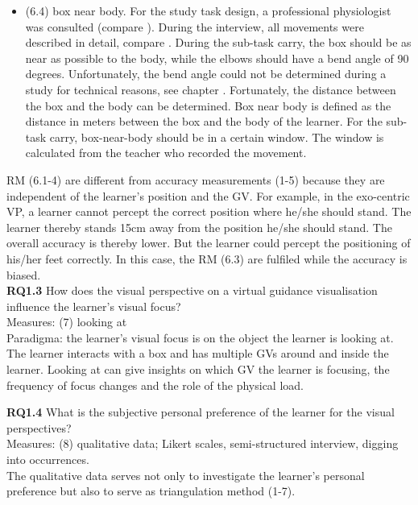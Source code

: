 \begin{itemize}
	\item[] (6.4) box near body. For the study task design, a professional physiologist was consulted (compare ). During the interview, all movements were described in detail, compare . During the sub-task carry, the box should be as near as possible to the body, while the elbows should have a bend angle of 90 degrees. Unfortunately, the bend angle could not be determined during a study for technical reasons, see chapter . Fortunately, the distance between the box and the body can be determined. Box near body is defined as the distance in meters between the box and the body of the learner. For the sub-task carry, box-near-body should be in a certain window. The window is calculated from the teacher who recorded the movement.
\end{itemize}

RM (6.1-4) are different from accuracy measurements (1-5) because they are independent of the learner's position and the GV. For example, in the exo-centric VP, a learner cannot percept the correct position where he/she should stand. The learner thereby stands 15cm away from the position he/she should stand. The overall accuracy is thereby lower. But the learner could percept the positioning of his/her feet correctly. In this case, the RM (6.3) are fulfiled while the accuracy is biased.\\

\textbf{RQ1.3} How does the visual perspective on a virtual guidance visualisation influence the learner's visual focus?\\
Measures: (7) looking at\\
Paradigma: the learner's visual focus is on the object the learner is looking at.\\
The learner interacts with a box and has multiple GVs around and inside the learner. Looking at can give insights on which GV the learner is focusing, the frequency of focus changes and the role of the physical load.

\textbf{RQ1.4} What is the subjective personal preference of the learner for the visual perspectives?\\
Measures: (8) qualitative data; Likert scales, semi-structured interview, digging into occurrences.\\
The qualitative data serves not only to investigate the learner's personal preference but also to serve as triangulation method (1-7).\\

